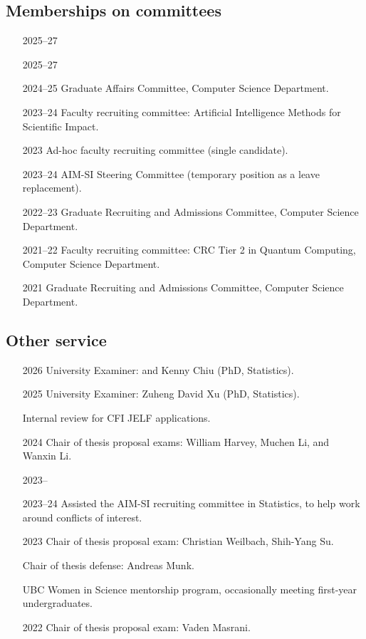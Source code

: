 \documentclass[10pt]{article}
\begin{document}
\subsection{Memberships on committees} %

\begin{itemize}[leftmargin=5em]
  \item[2025--27] 
  \item[2025--27] 
  \item[2024--25] {Graduate Affairs Committee, Computer Science Department.}
  \item[2023--24] {Faculty recruiting committee: Artificial Intelligence Methods for Scientific Impact.}
  \item[2023] {Ad-hoc faculty recruiting committee (single candidate).}
  \item[2023--24] {AIM-SI Steering Committee (temporary position as a leave replacement).}
  \item[2022--23] Graduate Recruiting and Admissions Committee, Computer Science Department.
  \item[2021--22] Faculty recruiting committee: CRC Tier 2 in Quantum Computing, Computer Science Department.
  \item[2021] Graduate Recruiting and Admissions Committee, Computer Science Department.
\end{itemize}

\subsection{Other service} %

\begin{itemize}[leftmargin=5em]
  \item[2026] University Examiner:  and Kenny Chiu (PhD, Statistics).
  \item[2025] {University Examiner: Zuheng David Xu (PhD, Statistics).}
  \item[]     {Internal review for CFI JELF applications.}
  \item[2024] Chair of thesis proposal exams: William Harvey, Muchen Li, and Wanxin Li.
  \item[2023--] 
  \item[2023--24] {Assisted the AIM-SI recruiting committee in Statistics, to help work around conflicts of interest.}
  \item[2023] Chair of thesis proposal exam: Christian Weilbach, Shih-Yang Su.
  \item[] Chair of thesis defense: Andreas Munk.
  \item[] UBC Women in Science mentorship program, occasionally meeting first-year undergraduates.
  \item[2022] Chair of thesis proposal exam: Vaden Masrani.
\end{itemize}
\end{document}
